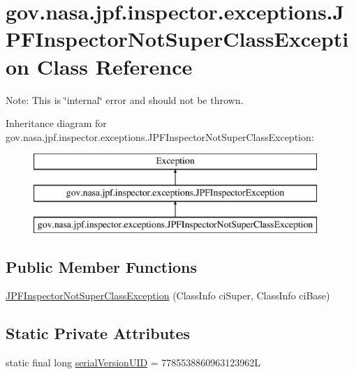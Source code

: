 \hypertarget{classgov_1_1nasa_1_1jpf_1_1inspector_1_1exceptions_1_1_j_p_f_inspector_not_super_class_exception}{}\section{gov.\+nasa.\+jpf.\+inspector.\+exceptions.\+J\+P\+F\+Inspector\+Not\+Super\+Class\+Exception Class Reference}
\label{classgov_1_1nasa_1_1jpf_1_1inspector_1_1exceptions_1_1_j_p_f_inspector_not_super_class_exception}


Note\+: This is \char`\"{}internal\char`\"{} error and should not be thrown.  


Inheritance diagram for gov.\+nasa.\+jpf.\+inspector.\+exceptions.\+J\+P\+F\+Inspector\+Not\+Super\+Class\+Exception\+:\begin{figure}[H]
\begin{center}
\leavevmode
\includegraphics[height=3.000000cm]{classgov_1_1nasa_1_1jpf_1_1inspector_1_1exceptions_1_1_j_p_f_inspector_not_super_class_exception}
\end{center}
\end{figure}
\subsection*{Public Member Functions}
\begin{DoxyCompactItemize}
\item 
\hyperlink{classgov_1_1nasa_1_1jpf_1_1inspector_1_1exceptions_1_1_j_p_f_inspector_not_super_class_exception_a86f0dfd01ccda4c86fb9f8d956f89967}{J\+P\+F\+Inspector\+Not\+Super\+Class\+Exception} (Class\+Info ci\+Super, Class\+Info ci\+Base)
\end{DoxyCompactItemize}
\subsection*{Static Private Attributes}
\begin{DoxyCompactItemize}
\item 
static final long \hyperlink{classgov_1_1nasa_1_1jpf_1_1inspector_1_1exceptions_1_1_j_p_f_inspector_not_super_class_exception_a7115d1996c4298b9578125ccc07f81e8}{serial\+Version\+U\+ID} = 7785538860963123962L
\end{DoxyCompactItemize}


